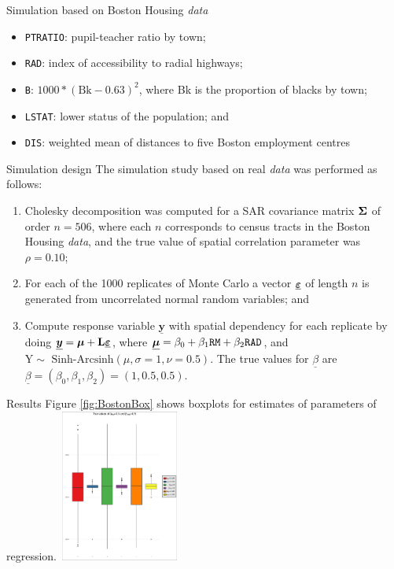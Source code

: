 \documentclass[10pt,unknownkeysallowed]{beamer}
\newcommand{\mat}[1]{\mbox{\boldmath{$#1$}}}
\begin{document}
    \begin{frame}{Simulation based on Boston Housing \textit{data}}
    \begin{itemize}
    \item \texttt{PTRATIO}: pupil-teacher ratio by town; 
    \item \texttt{RAD}: index of accessibility to radial highways;
        \item \texttt{B}: $1000*(\textrm{Bk} - 0.63)^2$, where Bk is the proportion of blacks by town;
   \item \texttt{LSTAT}: lower status of the population; and
   \item \texttt{DIS}: weighted mean of distances to five Boston employment centres 
    \end{itemize}
\end{frame}

\begin{frame}{ Simulation design}
The simulation study based on real \textit{data} was performed as follows:
\begin{enumerate}
   \item Cholesky decomposition was computed for a SAR covariance matrix $\mat{\Sigma}$ of order $n=506$, where each $n$ corresponds to census tracts  in the Boston Housing \textit{data}, and  the true value of spatial correlation parameter was $\rho=0.10$;
    \item  For each of the 1000 replicates of Monte Carlo a vector $\underline{\mat{\varepsilon}}$ of length $n$ is generated from uncorrelated normal random variables; and
    \item  Compute response variable $\underline{\mathbf{y}}$ with spatial dependency for each replicate by doing $\underline{\mat{y}}= \mat{\mu} + \textbf{\textrm{L}}\underline{\mat{\varepsilon}}$, where $\underline{\mat{\mu}} = \beta_0+ \beta_1\texttt{RM} + \beta_2\texttt{RAD}$, and $\textrm{Y}\sim \textrm{ Sinh-Arcsinh}(\mu,\sigma=1,\nu=0.5)$. The true values for $\underline{\beta}$ are
    $\underline{\beta}=(\beta_0,\beta_1,\beta_2)=(1,0.5,0.5)$.
\end{enumerate}
\end{frame}

\begin{frame}{Results}
Figure \ref{fig:BostonBox} shows boxplots for estimates of parameters of regression.
\center\includegraphics[width=4cm,height=5cm]{Betas_Boston_boxplot.pdf}\label{fig:BostonBox}
\end{frame}
\end{document}

